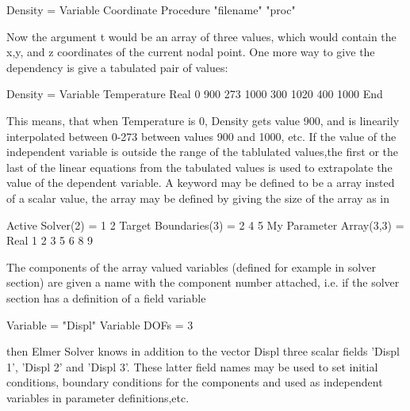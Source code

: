 \ttbegin
Density = Variable Coordinate
 Procedure "filename" "proc"
\ttend

Now the argument t would be an array of three values, which would contain the
x,y, and z  coordinates of the current nodal point. One  more way to give the
dependency is give a tabulated  pair of values:

\ttbegin
Density = Variable Temperature
  Real
   0 900
   273 1000
   300 1020
   400 1000
End
\ttend

This means, that when Temperature is 0, Density gets value 900, and is
linearily interpolated between 0-273 between values 900 and 1000, etc.
If the value of the independent variable is outside the range of the
tablulated values,the first or the last of the linear equations from the
tabulated  values is used to extrapolate the value of the dependent
variable. A keyword may be defined to be a array insted of a scalar
value, the array may be defined by giving the size of the array as in

\ttbegin
Active Solver(2) = 1 2
Target Boundaries(3) = 2 4 5
My Parameter Array(3,3) = Real 1 2 3  5 6  8 9 

\ttend

The components of the array valued variables (defined for example in solver
section) are given a name with the component number attached, i.e. if the
solver section has a definition of  a field variable

\ttbegin
Variable = "Displ"
Variable DOFs = 3
\ttend

then Elmer Solver knows in addition to the vector Displ three scalar fields
'Displ 1', 'Displ 2' and 'Displ 3'.   These latter field names may be used
to set initial conditions, boundary conditions for the components and
used as independent variables  in parameter definitions,etc.




